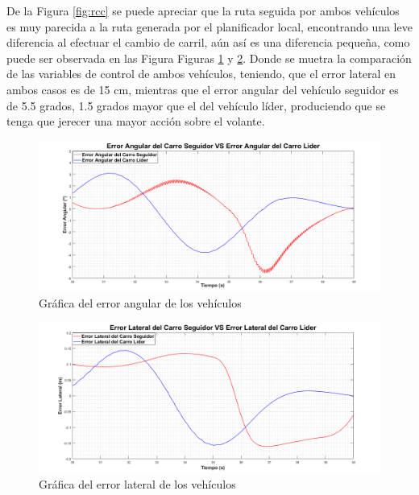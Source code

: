 \par De la Figura \ref{fig:rcc} se puede apreciar que la ruta seguida por ambos vehículos es muy parecida a la ruta generada por el planificador local, encontrando una leve diferencia al efectuar el cambio de carril, aún así es una diferencia pequeña, como puede ser observada en las Figura Figuras \ref{fig:ccea} y \ref{fig:ccel}. Donde se muetra la comparación de las variables de control de ambos vehículos, teniendo, que el error lateral en ambos casos es de 15 cm, mientras que el error angular del vehículo seguidor es de 5.5 grados, 1.5 grados mayor que el del vehículo líder, produciendo que se tenga que jerecer una mayor acción sobre el volante.\\ 


\begin{figure}[H]
	\centering
		\includegraphics[scale=0.35]{Imagenes/ccea}
		\caption{Gráfica del error angular de los vehículos}
		\label{fig:ccea}
\end{figure}	

\begin{figure}[H]
	\centering
		\includegraphics[scale=0.35]{Imagenes/ccel}
		\caption{Gráfica del error lateral de los vehículos}
		\label{fig:ccel}
\end{figure}	



